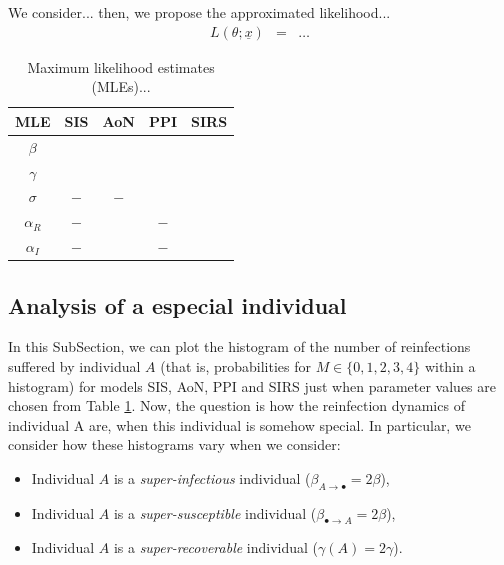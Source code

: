 \documentclass[preprint,12pt]{elsarticle}
\begin{document}
\par We consider... then, we propose the approximated likelihood...
\begin{eqnarray*}
L(\theta;{\underline x}) &=& \dots
\end{eqnarray*}

\begin{table}[h!]
{\small
\centering
\begin{tabular}{|c|c|c|c|c|}
\hline
MLE & SIS & AoN & PPI & SIRS\\
\hline
$\beta$ & & & & \\
\hline
$\gamma$ & & & & \\
\hline
$\sigma$ & $-$ & $-$ & & \\
\hline
$\alpha_R$ & $-$ & & $-$ & \\
\hline
$\alpha_I$ & $-$ & & $-$ & \\
\hline
\end{tabular}
\caption{Maximum likelihood estimates (MLEs)...}
\label{tab:tristan}}
\end{table}


\subsection{Analysis of a especial individual}
\label{SubSect33}

\par In this SubSection, we can plot the histogram of the number of reinfections suffered by individual $A$ (that is, probabilities for $M\in\{0,1,2,3,4\}$ within a histogram) for models SIS, AoN, PPI and SIRS just when parameter values are chosen from Table \ref{tab:tristan}. Now, the question is how the reinfection dynamics of individual A are, when this individual is somehow special. In particular, we consider how these histograms vary when we consider:
\begin{itemize}
 \item Individual $A$ is a {\it super-infectious} individual ($\beta_{A\rightarrow\bullet}=2\beta$),
 \item Individual $A$ is a {\it super-susceptible} individual ($\beta_{\bullet\rightarrow A}=2\beta$),
 \item Individual $A$ is a {\it super-recoverable} individual ($\gamma(A)=2\gamma$).
\end{itemize}

\end{document}
